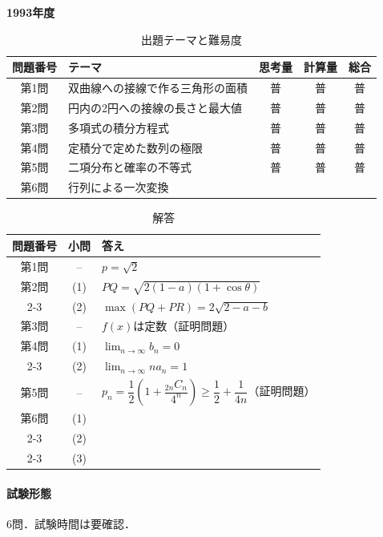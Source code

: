 \documentclass[../../main.tex]{subfiles}
\begin{document}
\begin{center}
  {\fontsize{48pt}{58pt}\selectfont \textbf{1993}\normalsize\textbf{年度}}
\end{center}

\begin{table}[htb]
  \centering
  \caption{出題テーマと難易度}
  \begin{tabular}{|c|p{6.2cm}|c|c|c|}
    \hline
    \textbf{問題番号} & \textbf{テーマ} & \textbf{思考量} & \textbf{計算量} & \textbf{総合} \\
    \hline
    第1問 & 双曲線への接線で作る三角形の面積 & 普 & 普 & 普 \\
    \hline
    第2問 & 円内の2円への接線の長さと最大値 & 普 & 普 & 普 \\
    \hline
    第3問 & 多項式の積分方程式 & 普 & 普 & 普 \\
    \hline
    第4問 & 定積分で定めた数列の極限 & 普 & 普 & 普 \\
    \hline
    第5問 & 二項分布と確率の不等式 & 普 & 普 & 普 \\
    \hline
    第6問 & 行列による一次変換 &  &  &  \\
    \hline
  \end{tabular}
\end{table}

\begin{table}[htb]
  \centering
  \caption{解答}
  \renewcommand{\arraystretch}{1.4}
  \begin{tabular}{|c|c|p{9cm}|}
    \hline
    \textbf{問題番号} & \textbf{小問} & \textbf{答え} \\
    \hline
    第1問 & -- & $p=\sqrt{2}$ \\
    \hline
    第2問 & (1) & $PQ=\sqrt{2(1-a)(1+\cos\theta)}$ \\
    \cline{2-3}
    & (2) & $\max(PQ+PR)=2\sqrt{2-a-b}$ \\
    \hline
    第3問 & -- & $f(x)$は定数（証明問題） \\
    \hline
    第4問 & (1) & $\lim_{n\to\infty}b_n=0$ \\
    \cline{2-3}
    & (2) & $\lim_{n\to\infty}na_n=1$ \\
    \hline
    第5問 & -- & $p_n=\dfrac{1}{2}\left(1+\dfrac{{}_{2n}C_n}{4^n}\right)\ge\dfrac{1}{2}+\dfrac{1}{4n}$（証明問題） \\
    \hline
    第6問 & (1) &  \\
    \cline{2-3}
    & (2) &  \\
    \cline{2-3}
    & (3) &  \\
    \hline
  \end{tabular}
\end{table}

\paragraph{試験形態}
6問．試験時間は要確認．
\end{document}
